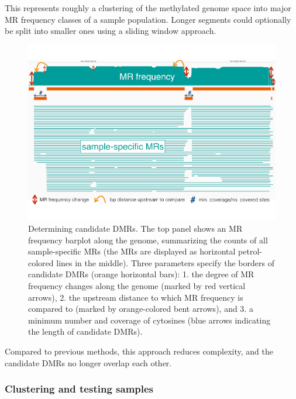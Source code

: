 \documentclass{article}
\begin{document}
This represents roughly a clustering of the methylated genome space into major MR frequency classes of a sample population.
Longer segments could optionally be split into smaller ones using a sliding window approach.

\begin{figure}[h]
	\centering
	\includegraphics[width=0.9\linewidth]{graphics/segments.pdf}
	\caption[Determining candidate DMRs.]{Determining candidate DMRs. The top panel shows an MR frequency barplot along the genome, summarizing the counts of all sample-specific MRs (the MRs are displayed as horizontal petrol-colored lines in the middle). Three parameters specify the borders of candidate DMRs (orange horizontal bars): 1. the degree of MR frequency changes along the genome (marked by red vertical arrows), 2. the upstream distance to which MR frequency is compared to (marked by orange-colored bent arrows), and 3. a minimum number and coverage of cytosines (blue arrows indicating the length of candidate DMRs).}
	\label{fig:segments}
\end{figure}

Compared to previous methods, this approach reduces complexity, and the candidate DMRs no longer overlap each other.

\subsubsection*{Clustering and testing samples}
\label{clustering}
\end{document}
